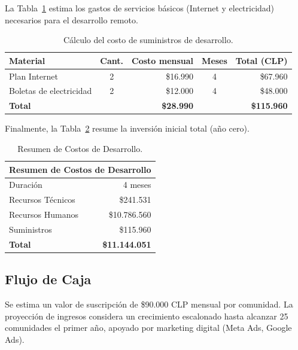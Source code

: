La Tabla~\ref{tab:costos_suministros} estima los gastos de servicios básicos (Internet y electricidad) necesarios para el desarrollo remoto.

\begin{table}[H]
    \centering
    \caption{Cálculo del costo de suministros de desarrollo.}
    \label{tab:costos_suministros}
    \begin{tabular}{|l|c|r|c|r|}
    \hline
    \textbf{Material} & \textbf{Cant.} & \textbf{Costo mensual} & \textbf{Meses} & \textbf{Total (CLP)}\\
    \hline
    Plan Internet & 2 & \$16.990 & 4 & \$67.960\\
    Boletas de electricidad & 2 & \$12.000 & 4 & \$48.000\\
    \hline
    \textbf{Total} & & \textbf{\$28.990} & & \textbf{\$115.960}\\
    \hline
    \end{tabular}
\end{table}

Finalmente, la Tabla~\ref{tab:costos_resumen} resume la inversión inicial total (año cero).

\begin{table}[H]
    \centering
    \caption{Resumen de Costos de Desarrollo.}
    \label{tab:costos_resumen}
    \begin{tabular}{|l|r|}
    \hline
    \multicolumn{2}{|c|}{\textbf{Resumen de Costos de Desarrollo}}\\
    \hline
    Duración & 4 meses\\
    \hline
    Recursos Técnicos & \$241.531\\
    \hline
    Recursos Humanos & \$10.786.560\\
    \hline
    Suministros & \$115.960\\
    \hline
    \textbf{Total} & \textbf{\$11.144.051}\\
    \hline
    \end{tabular}
\end{table}

\subsection{Flujo de Caja}

Se estima un valor de suscripción de \$90.000 CLP mensual por comunidad. La proyección de ingresos considera un crecimiento escalonado hasta alcanzar 25 comunidades el primer año, apoyado por marketing digital (Meta Ads, Google Ads).

